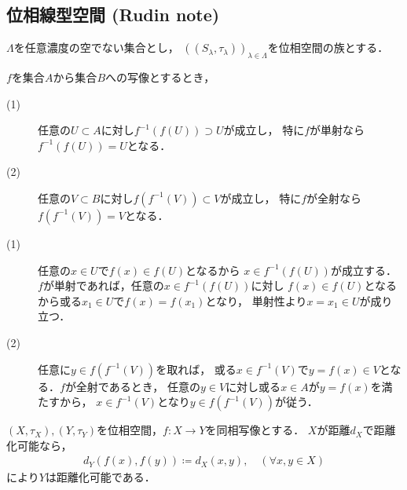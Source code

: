 \subsection{位相線型空間 (Rudin note)}
	\begin{screen}
		\begin{thm}[多変数連続写像は一変数写像として連続]
		\label{thm:multivariable_continuous_mapping_is_one_variable_continuous}
			$\Lambda$を任意濃度の空でない集合とし，
			$\left( (S_\lambda,\tau_\lambda) \right)_{\lambda \in \Lambda}$を位相空間の族とする．
			
		\end{thm}
	\end{screen}
	
	\begin{screen}
		\begin{thm}[全射・単射・像・原像]
			$f$を集合$A$から集合$B$への写像とするとき，
			\begin{description}
				\item[(1)] 任意の$U \subset A$に対し$f^{-1}\left(f(U)\right) \supset U$が成立し，
					特に$f$が単射なら$f^{-1}\left(f(U)\right) = U$となる．
				\item[(2)] 任意の$V \subset B$に対し$f\left(f^{-1}(V)\right) \subset V$が成立し，
					特に$f$が全射なら$f\left(f^{-1}(V)\right) = V$となる．
			\end{description}
		\end{thm}
	\end{screen}
	
	\begin{prf}\mbox{}
		\begin{description}
			\item[(1)] 任意の$x \in U$で$f(x) \in f(U)$となるから
				$x \in f^{-1}\left(f(U)\right)$が成立する．
				$f$が単射であれば，任意の$x \in f^{-1}\left(f(U)\right)$に対し
				$f(x) \in f(U)$となるから或る$x_1 \in U$で$f(x) = f(x_1)$となり，
				単射性より$x = x_1 \in U$が成り立つ．
				
			\item[(2)] 任意に$y \in f\left(f^{-1}(V)\right)$を取れば，
				或る$x \in f^{-1}(V)$で$y = f(x) \in V$となる．$f$が全射であるとき，
				任意の$y \in V$に対し或る$x \in A$が$y = f(x)$を満たすから，
				$x \in f^{-1}(V)$となり$y \in f\left(f^{-1}(V)\right)$が従う．
				\QED
		\end{description}
	\end{prf}
	
	\begin{screen}
		\begin{thm}[位相同型なら距離化可能性は遺伝する]
			$(X,\tau_X),(Y,\tau_Y)$を位相空間，$f:X \longrightarrow Y$を同相写像とする．
			$X$が距離$d_X$で距離化可能なら，
			\begin{align}
				d_Y\left(f(x),f(y)\right) \coloneqq d_X(x,y),
				\quad (\forall x,y \in X)
			\end{align}
			により$Y$は距離化可能である．
		\end{thm}
	\end{screen}
	
